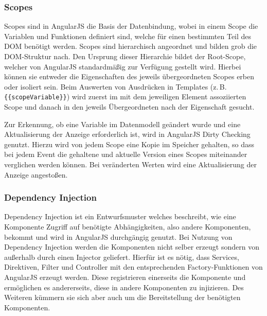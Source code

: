 \subsubsection{Scopes}
\label{sec:scopes}
Scopes sind in AngularJS die Basis der Datenbindung, wobei in einem Scope die Variablen und Funktionen definiert sind, welche für einen bestimmten Teil des DOM benötigt werden. Scopes sind hierarchisch angeordnet und bilden grob die DOM-Struktur nach. Den Ursprung dieser Hierarchie bildet der Root-Scope, welcher von AngularJS standardmäßig zur Verfügung gestellt wird. Hierbei können sie entweder die Eigenschaften des jeweils übergeordneten Scopes erben oder isoliert sein. Beim Auswerten von Ausdrücken in Templates (z.\,B. \texttt{\{\{scopeVariable\}\}}) wird zuerst im mit dem jeweiligen Element assoziierten Scope und danach in den jeweils Übergeordneten nach der Eigenschaft gesucht.\cites[23\psqq]{angular-boehm}[]{angular-scopes}

Zur Erkennung, ob eine Variable im Datenmodell geändert wurde und eine Aktualisierung der Anzeige erforderlich ist, wird in AngularJS Dirty Checking genutzt. Hierzu wird von jedem Scope eine Kopie im Speicher gehalten, so dass bei jedem Event die gehaltene und aktuelle Version eines Scopes miteinander verglichen werden können. Bei veränderten Werten wird eine Aktualisierung der Anzeige angestoßen.\cites[24]{angular-boehm}[]{angular-dirty}

\subsubsection{Dependency Injection}
Dependency Injection ist ein Entwurfsmuster welches beschreibt, wie eine Komponente Zugriff auf benötigte Abhängigkeiten, also andere Komponenten, bekommt und wird in AngularJS durchgängig genutzt. Bei Nutzung von Dependency Injection werden die Komponenten nicht selber erzeugt sondern von außerhalb durch einen Injector geliefert. Hierfür ist es nötig, dass Services, Direktiven, Filter und Controller mit den entsprechenden Factory-Funktionen von AngularJS erzeugt werden. Diese registrieren einerseits die Komponente und ermöglichen es andererseits, diese in andere Komponenten zu injizieren. Des Weiteren kümmern sie sich aber auch um die Bereitstellung der benötigten Komponenten.  \cite{angular-di}

\begin{figure}
	
\end{figure}

